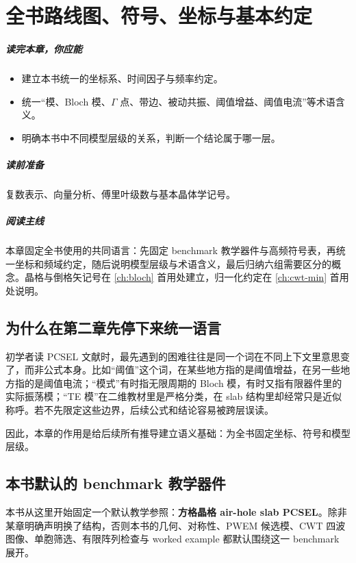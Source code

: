 ﻿%
\chapter{全书路线图、符号、坐标与基本约定}
\label{ch:roadmap}

\paragraph{读完本章，你应能}
\begin{itemize}
  \item 建立本书统一的坐标系、时间因子与频率约定。
  \item 统一“模、Bloch 模、$\Gamma$ 点、带边、被动共振、阈值增益、阈值电流”等术语含义。
  \item 明确本书中不同模型层级的关系，判断一个结论属于哪一层。
\end{itemize}

\paragraph{读前准备}
复数表示、向量分析、傅里叶级数与基本晶体学记号。

\paragraph{阅读主线}
本章固定全书使用的共同语言：先固定 benchmark 教学器件与高频符号表，再统一坐标和频域约定，随后说明模型层级与术语含义，最后归纳六组需要区分的概念。晶格与倒格矢记号在 \cref{ch:bloch} 首用处建立，归一化约定在 \cref{ch:cwt-min} 首用处说明。

\section{为什么在第二章先停下来统一语言}
初学者读 PCSEL 文献时，最先遇到的困难往往是同一个词在不同上下文里意思变了，而非公式本身。比如“阈值”这个词，在某些地方指的是阈值增益，在另一些地方指的是阈值电流；“模式”有时指无限周期的 Bloch 模，有时又指有限器件里的实际振荡模；“TE 模”在二维教材里是严格分类，在 slab 结构里却经常只是近似称呼。若不先限定这些边界，后续公式和结论容易被跨层误读。

因此，本章的作用是给后续所有推导建立语义基础：为全书固定坐标、符号和模型层级。

\section{本书默认的 benchmark 教学器件}
本书从这里开始固定一个默认教学参照：\textbf{方格晶格 air-hole slab PCSEL}。除非某章明确声明换了结构，否则本书的几何、对称性、PWEM 候选模、CWT 四波图像、单胞筛选、有限阵列检查与 worked example 都默认围绕这一 benchmark 展开。

